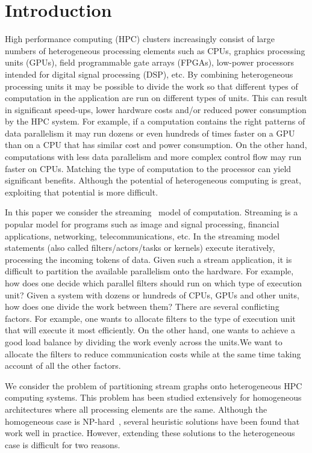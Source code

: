 \section{Introduction}
\label{sec:introduction}

High performance computing (HPC) clusters increasingly consist of large numbers
of heterogeneous processing elements such as CPUs, graphics processing units
(GPUs), field programmable gate arrays (FPGAs), low-power processors intended
for digital signal processing (DSP), etc. By combining heterogeneous
processing units it may be possible to divide the work so that different
types of computation in the application are run on different types of
units. This can result in significant speed-ups, lower hardware costs
and/or reduced power consumption by the HPC system.  For example, if a
computation contains the right patterns of data parallelism it may run
dozens or even hundreds of times faster on a GPU than on a CPU that has
similar cost and power consumption. On the other hand, computations with
less data parallelism and more complex control flow may run faster on
CPUs. Matching the type of computation to the processor can yield
significant benefits. Although the potential of heterogeneous computing is
great, exploiting that potential is more difficult.

In this paper we consider the streaming~\cite{jbuck94} model of
computation. Streaming is a popular model for programs such as image and
signal processing, financial applications, networking,
telecommunications, etc. In the streaming model statements (also called
filters/actors/tasks or kernels) execute iteratively, processing the incoming
tokens of data. Given such a stream application, it is
difficult to partition the available parallelism onto the hardware. For
example, how does one decide which parallel filters should run on which
type of execution unit? Given a system with dozens or hundreds of CPUs,
GPUs and other units, how does one divide the work between them?  There
are several conflicting factors. For example, one wants to allocate
filters to the type of execution unit that will execute it most
efficiently. On the other hand, one wants to achieve a good load balance
by dividing the work evenly across the units.We want to allocate the filters to
reduce communication costs while at the same time taking account of all the
other factors.

We consider the problem of partitioning stream graphs onto
heterogeneous HPC computing systems. This problem has been
studied extensively for homogeneous architectures where all processing
elements are the same. Although the homogeneous case is
NP-hard~\cite{vsar89}, several heuristic solutions have been found that
work well in practice. However, extending these solutions to the
heterogeneous case is difficult for two reasons.

